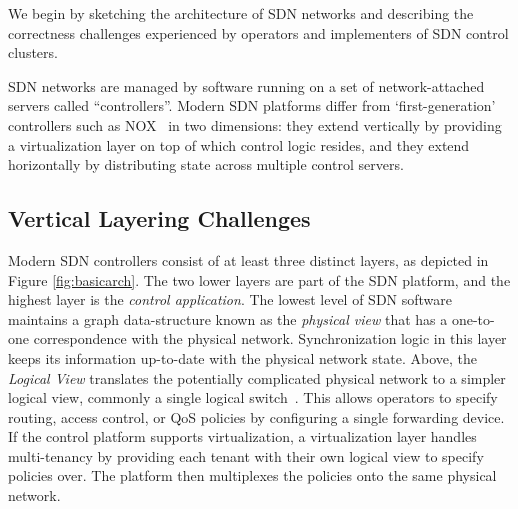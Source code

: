 We begin by sketching the architecture of SDN networks and
describing the correctness challenges experienced by operators and
implementers of SDN control clusters.

SDN networks are managed by software running on a set of network-attached
servers called ``controllers''. Modern SDN platforms differ from
`first-generation' controllers such as NOX~\cite{nox} in two dimensions: they
extend vertically by providing a virtualization layer on top of which control
logic resides, and they extend horizontally by distributing state across
multiple control servers.


\subsection{Vertical Layering Challenges}

Modern SDN controllers consist of at least three distinct layers, as depicted in
Figure \ref{fig:basicarch}. The two lower layers are part of the SDN platform,
and the highest layer is the \emph{control application}. The lowest level of SDN
software maintains a graph data-structure known as the \emph{physical view}
that has a one-to-one correspondence with the physical network.
Synchronization logic in this layer keeps its information up-to-date with the
physical network state. Above, the \emph{Logical View} translates the
potentially complicated physical network to a simpler logical view, commonly a single
logical switch~\cite{Casado:2010:VNF:1921151.1921162}. This allows operators to
specify routing, access control, or QoS policies by configuring a single
forwarding device. If the control platform supports virtualization, a
virtualization layer handles multi-tenancy by providing each tenant with their
own logical view to specify policies over. The platform then multiplexes the
policies onto the same physical network.

